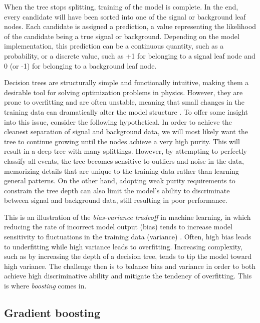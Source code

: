 When the tree stops splitting, training of the model is complete. In the end, every candidate will have been sorted into one of the signal or background leaf nodes. Each candidate is assigned a prediction, a value representing the likelihood of the candidate being a true signal or background. Depending on the model implementation, this prediction can be a continuous quantity, such as a probability, or a discrete value, such as +1 for belonging to a signal leaf node and 0 (or -1) for belonging to a background leaf node.

Decision trees are structurally simple and functionally intuitive, making them a desirable tool for solving optimization problems in physics. However, they are prone to overfitting and are often unstable, meaning that small changes in the training data can dramatically alter the model structure \cite{BDT}. To offer some insight into this issue, consider the following hypothetical. In order to achieve the cleanest separation of signal and background data, we will most likely want the tree to continue growing until the nodes achieve a very high purity. This will result in a deep tree with many splittings. However, by attempting to perfectly classify all events, the tree becomes sensitive to outliers and noise in the data, memorizing details that are unique to the training data rather than learning general patterns. On the other hand, adopting weak purity requirements to constrain the tree depth can also limit the model's ability to discriminate between signal and background data, still resulting in poor performance.

This is an illustration of the {\it bias-variance tradeoff} in machine learning, in which reducing the rate of incorrect model output (bias) tends to increase model sensitivity to fluctuations in the training data (variance) \cite{BDT}. Often, high bias leads to underfitting while high variance leads to overfitting. Increasing complexity, such as by increasing the depth of a decision tree, tends to tip the model toward high variance. The challenge then is to balance bias and variance in order to both achieve high discriminative ability and mitigate the tendency of overfitting. This is where {\it boosting} comes in.

\subsection{Gradient boosting}
\label{sec.ml_gradient_boosting}

